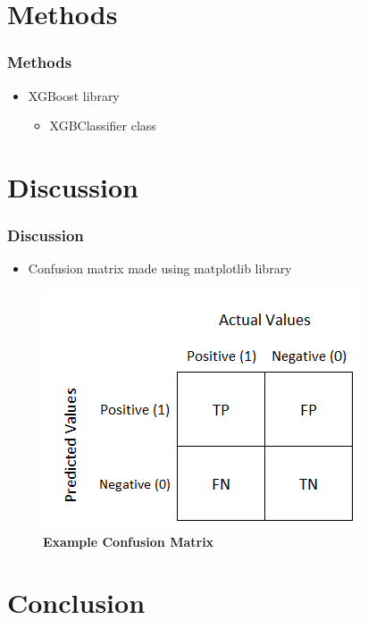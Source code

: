 \documentclass[12pt]{beamer}
\begin{document}
\section{Methods}



\begin{frame}
\frametitle{Methods}

\pause
\begin{itemize}
  \item XGBoost library
  \begin{itemize}
    \pause
    \item XGBClassifier class
  \end{itemize}
\end{itemize}

\end{frame}



\section{Discussion}

\begin{frame}
\frametitle{Discussion}
\pause
\begin{itemize}
  \item Confusion matrix made using matplotlib library
\end{itemize}
\pause
\begin{figure}[h]
  \includegraphics[scale = 0.5]{confusionmatrix.png}
  \caption{\textbf{Example Confusion Matrix}}
\end{figure}

\end{frame}

\section{Conclusion}
\end{document}

